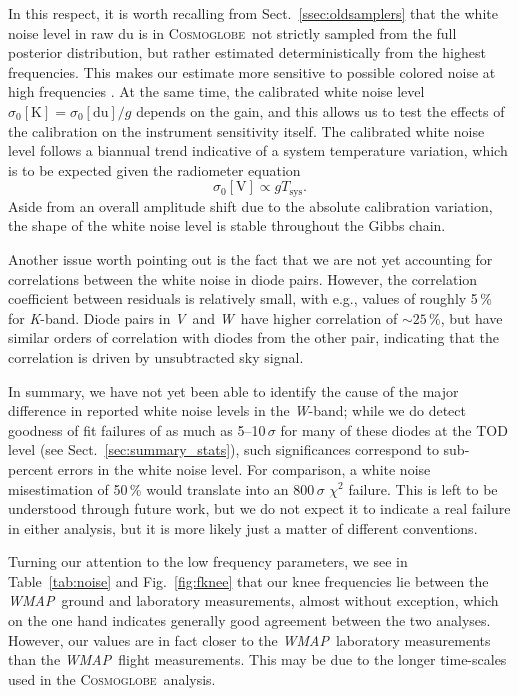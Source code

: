 \documentclass[twocolumn]{../../common/aa}
\def\WMAP{\emph{WMAP}}
\newcommand{\cosmoglobe}{\textsc{Cosmoglobe}}
\newcommand{\K}[0]{\textit K}
\newcommand{\V}[0]{\textit V}
\newcommand{\W}[0]{\textit W}
\begin{document}
In this respect, it is worth recalling from Sect.~\ref{ssec:oldsamplers} that the white noise level in raw du is in \cosmoglobe\ not strictly sampled from the full posterior distribution, but rather estimated deterministically from the highest frequencies. This makes our estimate more sensitive to possible colored noise at high frequencies \citep{bp17}. At the same time, the calibrated white noise level $\sigma_0[\mathrm K]=\sigma_0[\mathrm{du}]/g$ depends on the gain, and this  allows us to test the effects of the calibration on the instrument sensitivity itself. The calibrated white noise level follows a biannual trend indicative of a system temperature variation, which is to be expected given the radiometer equation
\begin{equation}
	\sigma_0[\mathrm V]\propto gT_\mathrm{sys}.
\end{equation}
Aside from an overall amplitude shift due to the absolute calibration variation, the shape of the white noise level is stable throughout the Gibbs chain.

Another issue worth pointing out is the fact that we are not yet accounting for correlations between the white noise in diode pairs. However, the correlation coefficient between residuals is relatively small, with e.g., values of roughly 5\,\% for \K-band. Diode pairs in \V\ and \W\ have higher correlation of $\sim25\,\%$, but have similar orders of correlation with diodes from the other pair, indicating that the correlation is driven by unsubtracted sky signal.

In summary, we have not yet been able to identify the cause of the major difference in reported white noise levels in the \W-band; while we do detect goodness of fit failures of as much as 5--10\,$\sigma$ for many of these diodes at the TOD level (see Sect.~\ref{sec:summary_stats}), such significances correspond to sub-percent errors in the white noise level. For comparison, a white noise misestimation of 50\,\% would translate into an 800\,$\sigma$ $\chi^2$ failure. This is left to be understood through future work, but we do not expect it to indicate a real failure in either analysis, but it is more likely just a matter of different conventions.

Turning our attention to the low frequency parameters, we see in Table~\ref{tab:noise} and Fig.~\ref{fig:fknee} that our knee frequencies lie between the \WMAP\ ground and laboratory measurements, almost without exception, which on the one hand indicates generally good agreement between the two analyses. However, our values are in fact closer to the \WMAP\ laboratory measurements than the \WMAP\ flight measurements. This may be due to the longer time-scales used in the \cosmoglobe\ analysis.
\end{document}
